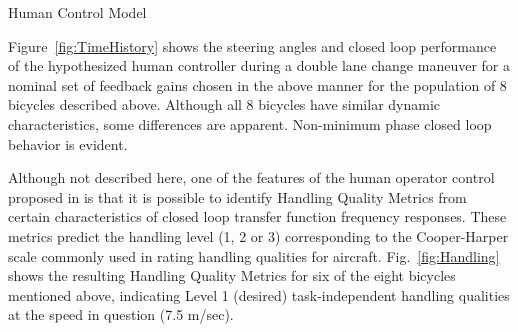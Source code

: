 \documentclass[final]{beamer}
\newlength{\onecolwid}
\begin{document}
{\begin{center}
\begin{columns}[t]
\begin{column}{\onecolwid}
\begin{block}{Human Control Model}
{    Figure~\ref{fig:TimeHistory} shows the steering angles and closed loop
    performance of the hypothesized human controller during a double lane
    change maneuver for a nominal set of feedback gains chosen in the above
    manner for the population of 8 bicycles described above. Although all 8
    bicycles have similar dynamic characteristics, some differences are
    apparent.  Non-minimum phase closed loop behavior is evident.
    \begin{figure}[h]
      \begin{center}
        \qquad
        \caption{}
      \end{center}
      \label{fig:TimeHandling}
    \end{figure}

    Although not described here, one of the features of the human operator
    control proposed in \cite{Hess1990} is that it is possible to identify
    Handling Quality Metrics from certain characteristics of closed loop
    transfer function frequency responses. These metrics predict the handling
    level (1, 2 or 3) corresponding to the Cooper-Harper \cite{Cooper1969}
    scale commonly used in rating handling qualities for aircraft.
    Fig.~\ref{fig:Handling} shows the resulting Handling Quality Metrics for
    six of the eight bicycles mentioned above, indicating Level 1 (desired)
    task-independent handling qualities at the speed in question (7.5 m/sec).
    }
  \end{block}


\end{column}
\end{columns}
\end{center}}
\end{document}
